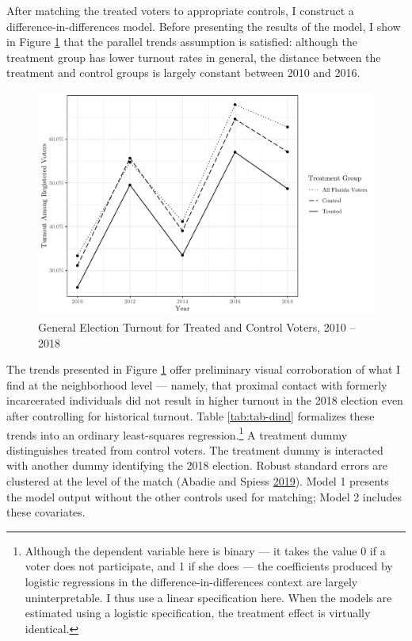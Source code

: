 \documentclass[
  12pt,
]{article}
\begin{document}
After matching the treated voters to appropriate controls, I construct a difference-in-differences model. Before presenting the results of the model, I show in Figure \ref{fig:dind} that the parallel trends assumption is satisfied: although the treatment group has lower turnout rates in general, the distance between the treatment and control groups is largely constant between 2010 and 2016.

\begin{figure}[H]

{\centering \includegraphics{amendment_4_turnout_files/figure-latex/dind-1} 

}

\caption{\label{fig:dind}General Election Turnout for Treated and Control Voters, 2010 -- 2018}\label{fig:dind}
\end{figure}

The trends presented in Figure \ref{fig:dind} offer preliminary visual corroboration of what I find at the neighborhood level --- namely, that proximal contact with formerly incarcerated individuals did not result in higher turnout in the 2018 election even after controlling for historical turnout. Table \ref{tab:tab-dind} formalizes these trends into an ordinary least-squares regression.\footnote{Although the dependent variable here is binary --- it takes the value 0 if a voter does not participate, and 1 if she does --- the coefficients produced by logistic regressions in the difference-in-differences context are largely uninterpretable. I thus use a linear specification here. When the models are estimated using a logistic specification, the treatment effect is virtually identical.} A treatment dummy distinguishes treated from control voters. The treatment dummy is interacted with another dummy identifying the 2018 election. Robust standard errors are clustered at the level of the match (Abadie and Spiess \protect\hyperlink{ref-Abadie2019}{2019}). Model 1 presents the model output without the other controls used for matching; Model 2 includes these covariates.
\end{document}
